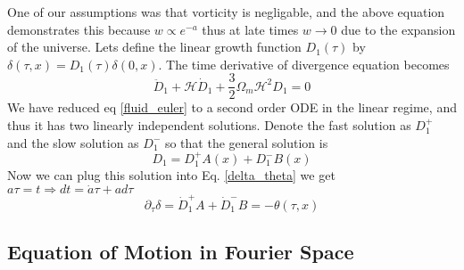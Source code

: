 One of our assumptions was that vorticity is negligable, and the above equation demonstrates this because $w \propto e^{-a}$ thus at late times $w\rightarrow 0$ due to the expansion of the universe. Lets define the linear growth function $D_1(\tau)$ by $\delta(\tau,x) = D_1(\tau)\delta(0,x)$. The time derivative of divergence equation becomes 
\begin{equation}
	\ddot D_1 + \mathcal{H} \dot D_1 + \frac{3}{2}\Omega_m \mathcal{H}^2 D_1 = 0
\end{equation}
We have reduced eq \ref{fluid_euler} to a second order ODE in the linear regime, and thus it has two linearly independent solutions. Denote the fast solution as $D_1^+$ and the slow solution as $D_1^-$ so that the general solution is
\begin{equation}
	D_1 = D_1^+ A(x) + D_1^- B(x)
\end{equation}
Now we can plug this solution into Eq. \ref{delta_theta} we get $a \tau = t \Rightarrow dt = \dot a \tau + a d\tau$
\begin{equation}
	\partial_\tau\delta = \dot D_1^+ A + \dot D_1^- B = -\theta(\tau,x)
\end{equation}
\subsection{Equation of Motion in Fourier Space}

